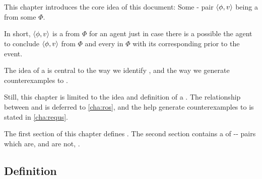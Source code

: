 \chapter{}
\label{cha:fcs}

\nocite{Ryle:1946tu}



\begin{note}
  This chapter introduces the core idea of this document:
  Some - pair \(\langle\phi, v\rangle\) being a \emph{\fc{}} from some  \(\Phi\).

  In short, \(\langle\phi, v\rangle\) is a \fc{} from \(\Phi\) for an agent just in case there is a possible  the agent to conclude \(\langle\phi, v\rangle\) from \(\Phi\) and \evals{} every \prop{} in \(\Phi\) with its corresponding \val{} prior to the event.
\end{note}

\begin{note}
  The idea of a  is central to the way we identify , and the way we generate counterexamples to \issueInclusion{}.

  Still, this chapter is limited to the idea and definition of a \fc{}.
  The relationship between  and  is deferred to \autoref{cha:ros}, and the  help generate counterexamples to \issueInclusion{} is stated in \autoref{cha:requs}.
\end{note}

\begin{note}
  The first section of this chapter defines .
  The second section contains a  of -- pairs which are, and are not, .
\end{note}

\section{Definition}
\label{cha:fcs:def}

